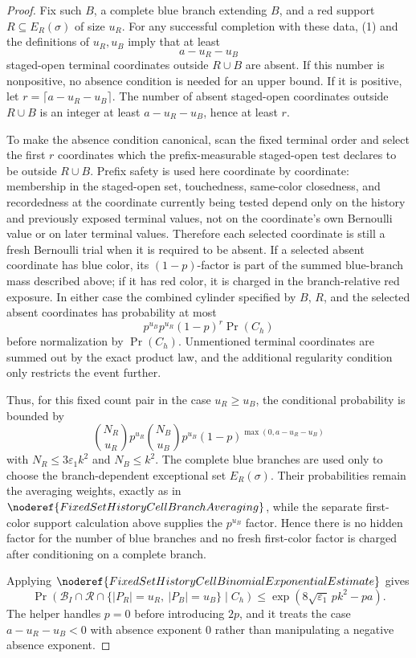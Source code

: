 \begin{proof}
Fix such \(B\), a complete blue branch extending \(B\), and a red support
\(R\subseteq E_R(\sigma)\) of size \(u_R\).  For any successful completion
with these data, (1) and the definitions of \(u_R,u_B\) imply that at least
\[
a-u_R-u_B
\]
staged-open terminal coordinates outside \(R\cup B\) are absent.  If this
number is nonpositive, no absence condition is needed for an upper bound.  If
it is positive, let \(r=\lceil a-u_R-u_B\rceil\).  The number of absent
staged-open coordinates outside \(R\cup B\) is an integer at least
\(a-u_R-u_B\), hence at least \(r\).

To make the absence condition canonical, scan the fixed terminal order and
select the first \(r\) coordinates which the prefix-measurable staged-open
test declares to be outside \(R\cup B\).  Prefix safety is used here
coordinate by coordinate: membership in the staged-open set, touchedness,
same-color closedness, and recordedness at the coordinate currently being
tested depend only on the history and previously exposed terminal values, not
on the coordinate's own Bernoulli value or on later terminal values.  Therefore
each selected coordinate is still a fresh Bernoulli trial when it is required
to be absent.  If a selected absent coordinate has blue color, its
\((1-p)\)-factor is part of the summed blue-branch mass described above; if it
has red color, it is charged in the branch-relative red exposure.  In either
case the combined cylinder specified by \(B\), \(R\), and the selected absent
coordinates has probability at most
\[
p^{u_B}p^{u_R}(1-p)^r\Pr(C_h)
\]
before normalization by \(\Pr(C_h)\).  Unmentioned terminal coordinates are
summed out by the exact product law, and the additional regularity condition
only restricts the event further.

Thus, for this fixed count pair in the case \(u_R\ge u_B\), the conditional
probability is bounded by
\[
\binom{N_R}{u_R}p^{u_R}
\binom{N_B}{u_B}p^{u_B}
(1-p)^{\max(0,a-u_R-u_B)}
\]
with \(N_R\le3\varepsilon_1k^2\) and \(N_B\le k^2\).  The complete blue
branches are used only to choose the branch-dependent exceptional set
\(E_R(\sigma)\).  Their probabilities remain the averaging weights, exactly
as in \(\noderef{FixedSetHistoryCellBranchAveraging}\), while the separate
first-color support calculation above supplies the \(p^{u_B}\) factor.  Hence
there is no hidden factor for the number of blue branches and no fresh
first-color factor is charged after conditioning on a complete branch.

Applying
\(\noderef{FixedSetHistoryCellBinomialExponentialEstimate}\) gives
\[
\Pr(\mathcal B_I\cap\mathcal R
\cap\{|P_R|=u_R,\ |P_B|=u_B\}\mid C_h)
\le
\exp\!\left(
8\sqrt{\varepsilon_1}\,pk^2-pa\right). \tag{3}
\]
The helper handles \(p=0\) before introducing \(2p\), and it treats the case
\(a-u_R-u_B<0\) with absence exponent \(0\) rather than manipulating a
negative absence exponent.


\end{proof}
